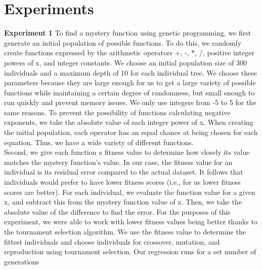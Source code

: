 
\section{Experiments}
\label{sec:expts}

\textbf{Experiment 1}
To find a mystery function using genetic programming, we first generate an initial population of possible functions. To do this, we randomly
create functions expressed by the arithmetic operators +, -, *, /, positive integer powers of x, and
integer constants. We choose an initial population size of 300 individuals and a maximum depth of 10 for each individual tree. We choose these parameters because they are large enough for us to get a large variety of possible functions while maintaining a certain degree of randomness, but small enough to run quickly and prevent memory issues. We only use integers from -5 to 5 for the same reasons. To prevent the possibility of functions calculating negative exponents, we take the absolute value of each integer power of x. When creating the initial population, each operator has an equal chance at being chosen for each equation. Thus, we have a wide variety of different functions. \\

Second, we give each function a fitness value to determine how closely its value matches the mystery function's value. In our case, the fitness value for an individual is its residual error compared to the actual dataset. It follows that individuals would prefer to have lower fitness scores (i.e., for us lower fitness scores are better). For each individual, we evaluate the function value for a given x, and subtract this from the mystery function value of x. Then, we take the absolute value of the difference to find the error. For the purposes of this experiment, we were able to work with lower fitness values being better thanks to the tournament selection algorithm. We use the fitness value to determine the fittest individuals and choose individuals for crossover, mutation, and reproduction using tournament selection. Our regression runs for a set number of generations\\

